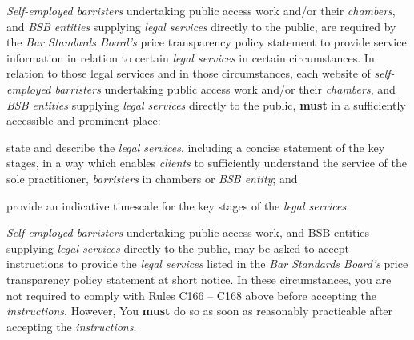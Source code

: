 
\emph{Self-employed barristers} undertaking public access work and/or
their \emph{chambers}, and \emph{BSB entities} supplying \emph{legal
services} directly to the public, are required by the \emph{Bar
Standards Board's} price transparency policy statement to provide
service information in relation to certain \emph{legal services} in
certain circumstances. In relation to those legal services and in those
circumstances, each website of \emph{self-employed barristers}
undertaking public access work and/or their \emph{chambers}, and
\emph{BSB entities} supplying \emph{legal services} directly to the
public, \textcolor{myred}{\textbf{must}} in a sufficiently accessible and prominent place:
\begin{numlist}\item state and describe the \emph{legal services}, including a concise
statement of the key stages, in a way which enables \emph{clients} to
sufficiently understand the service of the sole practitioner,
\emph{barristers} in chambers or \emph{BSB entity}; and
\item provide an indicative timescale for the key stages of the \emph{legal
services}.
\end{numlist}


\emph{Self-employed barristers} undertaking public access work, and BSB
entities supplying \emph{legal services} directly to the public, may be
asked to accept instructions to provide the \emph{legal services} listed
in the \emph{Bar Standards Board's} price transparency policy statement
at short notice. In these circumstances, you are not required to comply
with Rules C166 -- C168 above before accepting the \emph{instructions}.
However, You \textcolor{myred}{\textbf{must}} do so as soon as reasonably practicable after
accepting the \emph{instructions}.

